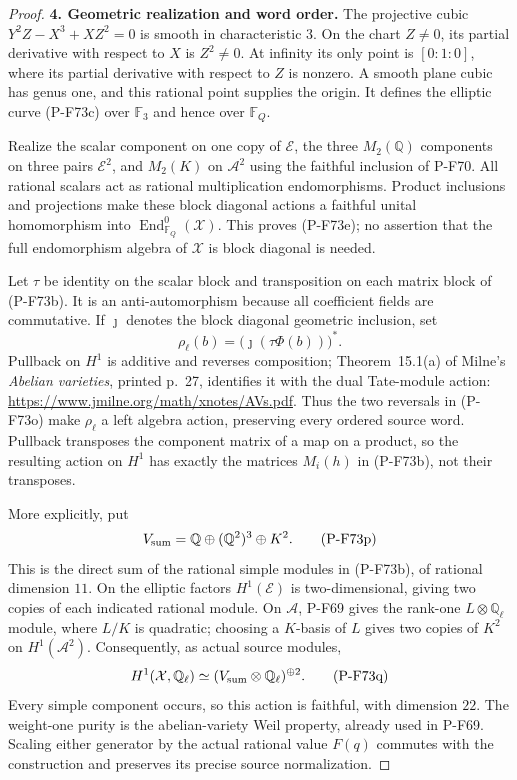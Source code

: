 \begin{proof}
\par\medskip\noindent\textbf{4. Geometric realization and word order.}
The projective cubic
$Y^2Z-X^3+XZ^2=0$ is smooth in characteristic $3$.
On the chart $Z\ne0$, its partial derivative with
respect to $X$ is $Z^2\ne0$.  At infinity its only
point is $[0:1:0]$, where its partial derivative
with respect to $Z$ is nonzero.  A smooth plane
cubic has genus one, and this rational point supplies
the origin.  It defines the elliptic curve (P-F73c)
over $\mathbb F_3$ and hence over $\mathbb F_Q$.

Realize the scalar component on one copy of
$\mathcal E$, the three $M_2(\mathbb Q)$ components
on three pairs $\mathcal E^2$, and $M_2(K)$ on
$\mathcal A^2$ using the faithful inclusion of
P-F70.  All rational scalars act as rational
multiplication endomorphisms.  Product inclusions
and projections make these block diagonal actions
a faithful unital homomorphism into
$\operatorname{End}_{\mathbb F_Q}^0(\mathcal X)$.
This proves (P-F73e); no assertion that the full
endomorphism algebra of $\mathcal X$ is block
diagonal is needed.

Let $\tau$ be identity on the scalar block and
transposition on each matrix block of (P-F73b).
It is an anti-automorphism because all coefficient
fields are commutative.  If $\jmath$ denotes the
block diagonal geometric inclusion, set
\[
                 \rho_\ell(b)=
                   \bigl(\jmath(\tau\Phi(b))\bigr)^*.
                                                               \tag{P-F73o}
\]
Pullback on $H^1$ is additive and reverses
composition; Theorem~15.1(a) of Milne's
\emph{Abelian varieties}, printed p.~27,
identifies it with the dual Tate-module action:
\url{https://www.jmilne.org/math/xnotes/AVs.pdf}.
Thus the two reversals in (P-F73o) make
$\rho_\ell$ a left algebra action, preserving
every ordered source word.  Pullback transposes
the component matrix of a map on a product,
so the resulting action on $H^1$ has exactly
the matrices $M_i(h)$ in (P-F73b), not their
transposes.

More explicitly, put
\[
                  V_{\rm sum}=\mathbb Q
                          \oplus(\mathbb Q^2)^3\oplus K^2.
                                                               \tag{P-F73p}
\]
This is the direct sum of the rational simple
modules in (P-F73b), of rational dimension $11$.
On the elliptic factors $H^1(\mathcal E)$ is
two-dimensional, giving two copies of each
indicated rational module.  On $\mathcal A$,
P-F69 gives the rank-one $L\otimes\mathbb Q_\ell$
module, where $L/K$ is quadratic; choosing a
$K$-basis of $L$ gives two copies of $K^2$ on
$H^1(\mathcal A^2)$.  Consequently, as actual
source modules,
\[
 H^1(\mathcal X,\mathbb Q_\ell)
      \simeq(V_{\rm sum}\otimes\mathbb Q_\ell)^{\oplus2}.
                                                               \tag{P-F73q}
\]
Every simple component occurs, so this action is
faithful, with dimension $22$.  The weight-one
purity is the abelian-variety Weil property,
already used in P-F69.  Scaling either generator
by the actual rational value $F(q)$ commutes
with the construction and preserves its precise
source normalization.
\end{proof}

